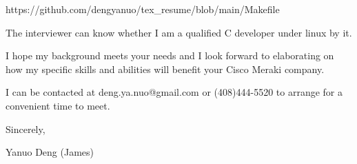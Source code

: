 \centerline{
https://github.com/dengyanuo/tex\_resume/blob/main/Makefile
}

The interviewer can know whether I am a qualified C developer under linux by it.

{ \bigbreak } 
I hope my background meets your needs and I look
forward to elaborating on how my specific skills and abilities will benefit your Cisco Meraki company.

{ \bigbreak } 
I can be contacted at deng.ya.nuo@gmail.com
or (408)444-5520 to arrange for a convenient time to meet.

{ \bigbreak } 




\vskip 60pt

{ \bigbreak } 
Sincerely,

Yanuo Deng (James)

\bye
